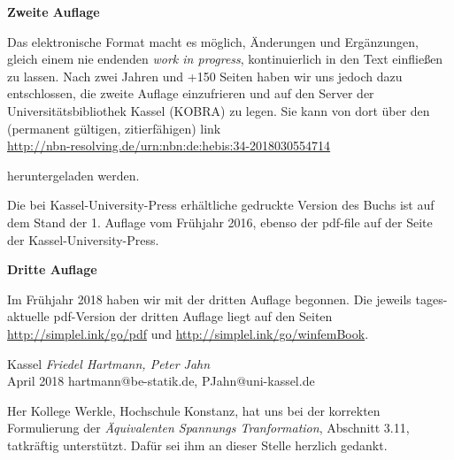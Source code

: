 
\begin{flushleft}\large{\bf{Zweite Auflage}} \end{flushleft}

Das elektronische Format macht es m\"{o}glich, \"{A}nderungen und Erg\"{a}nzungen, gleich einem nie endenden {\em work in progress\/}, kontinuierlich in den Text einflie{\ss}en zu lassen. Nach zwei Jahren und +150 Seiten haben wir uns jedoch dazu entschlossen, die zweite Auflage \glq einzufrieren\grq{} und auf den Server der Universit\"{a}tsbibliothek Kassel (KOBRA) zu legen. Sie kann von dort \"{u}ber den (permanent g\"{u}ltigen, \glq zitierf\"{a}higen\grq{}) link\\

\href{http://nbn-resolving.de/urn:nbn:de:hebis:34-2018030554714}{http://nbn-resolving.de/urn:nbn:de:hebis:34-2018030554714}

\begin{flushleft} heruntergeladen werden. \end{flushleft}
Die bei Kassel-University-Press erh\"{a}ltliche gedruckte Version des Buchs ist auf dem Stand der 1. Auflage vom Fr\"{u}hjahr 2016, ebenso der pdf-file auf der Seite der Kassel-University-Press.


\begin{flushleft}\large{\bf{Dritte Auflage}} \end{flushleft}

Im Fr\"{u}hjahr 2018 haben wir mit der dritten Auflage begonnen. Die jeweils tages-aktuelle pdf-Version der dritten Auflage liegt auf den Seiten\\

 \href{http://simplel.ink/go/pdf}{http://simplel.ink/go/pdf} und \href{http://simplel.ink/go/winfemBook}{http://simplel.ink/go/winfemBook}.

\begin{flushright}\noindent
Kassel  {\hfill {\it Friedel Hartmann, Peter Jahn}}\\\vspace{0.1cm}
April 2018   {\hfill {hartmann@be-statik.de, PJahn@uni-kassel.de}}\\
\end{flushright}

\vspace{1 cm}
\begin{acknowledgement}
Her Kollege Werkle, Hochschule Konstanz, hat uns bei der korrekten Formulierung der {\em \"{A}quivalenten Spannungs Tranformation\/}, Abschnitt 3.11, tatkr\"{a}ftig unterst\"{u}tzt. Daf\"{u}r sei ihm an dieser Stelle herzlich gedankt.\\
\end{acknowledgement}


